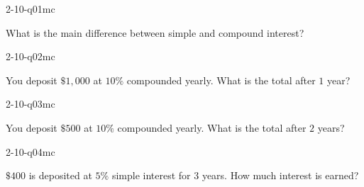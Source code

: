 

\begin{practiceQuestion}{2-10-q01}{mc}
\begin{questionText}
What is the main difference between simple and compound interest?
\end{questionText}
\end{practiceQuestion}

\begin{practiceQuestion}{2-10-q02}{mc}
\begin{questionText}
You deposit $\$1{,}000$ at $10\%$ compounded yearly. What is the total after $1$ year?
\end{questionText}
\end{practiceQuestion}

\begin{practiceQuestion}{2-10-q03}{mc}
\begin{questionText}
You deposit $\$500$ at $10\%$ compounded yearly. What is the total after $2$ years?
\end{questionText}
\end{practiceQuestion}

\begin{practiceQuestion}{2-10-q04}{mc}
\begin{questionText}
$\$400$ is deposited at $5\%$ simple interest for $3$ years. How much interest is earned?
\end{questionText}
\end{practiceQuestion}

